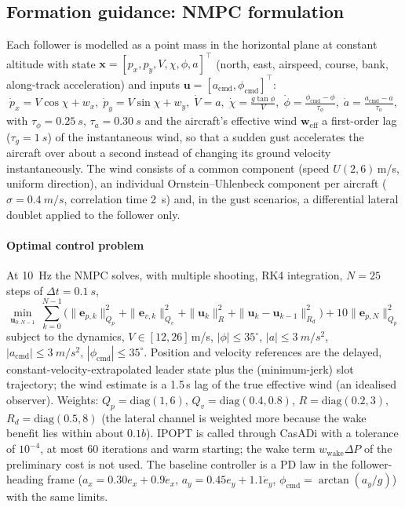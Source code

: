 \subsection{Formation guidance: NMPC formulation}\label{sec:nmpc}
Each follower is modelled as a point mass in the horizontal plane at constant altitude with state $\mathbf x=[p_x,p_y,V,\chi,\phi,a]^\top$ (north, east, airspeed, course, bank, along-track acceleration) and inputs $\mathbf u=[a_{\mathrm{cmd}},\phi_{\mathrm{cmd}}]^\top$:
\begin{equation}
\dot p_x=V\cos\chi+w_x,\;\dot p_y=V\sin\chi+w_y,\;\dot V=a,\;\dot\chi=\tfrac{g\tan\phi}{V},\;\dot\phi=\tfrac{\phi_{\mathrm{cmd}}-\phi}{\tau_\phi},\;\dot a=\tfrac{a_{\mathrm{cmd}}-a}{\tau_a},
\end{equation}
with $\tau_\phi=\SI{0.25}{s}$, $\tau_a=\SI{0.30}{s}$ and the aircraft's effective wind $\mathbf w_{\mathrm{eff}}$ a first-order lag ($\tau_g=\SI{1}{s}$) of the instantaneous wind, so that a sudden gust accelerates the aircraft over about a second instead of changing its ground velocity instantaneously. The wind consists of a common component (speed $U(2,6)$\,m/s, uniform direction), an individual Ornstein--Uhlenbeck component per aircraft ($\sigma=\SI{0.4}{m/s}$, correlation time \SI{2}{s}) and, in the gust scenarios, a differential lateral doublet applied to the follower only.

\paragraph{Optimal control problem} At \SI{10}{Hz} the NMPC solves, with multiple shooting, RK4 integration, $N=25$ steps of $\Delta t=\SI{0.1}{s}$,
\begin{equation}
\min_{\mathbf u_{0:N-1}}\ \sum_{k=0}^{N-1}\Big(\|\mathbf e_{p,k}\|^2_{Q_p}+\|\mathbf e_{v,k}\|^2_{Q_v}+\|\mathbf u_k\|^2_{R}+\|\mathbf u_k-\mathbf u_{k-1}\|^2_{R_d}\Big)+10\|\mathbf e_{p,N}\|^2_{Q_p}
\end{equation}
subject to the dynamics, $V\in[12,26]$\,m/s, $|\phi|\le35^\circ$, $|a|\le\SI{3}{m/s^2}$, $|a_{\mathrm{cmd}}|\le\SI{3}{m/s^2}$, $|\phi_{\mathrm{cmd}}|\le35^\circ$. Position and velocity references are the delayed, constant-velocity-extrapolated leader state plus the (minimum-jerk) slot trajectory; the wind estimate is a 1.5\,s lag of the true effective wind (an idealised observer). Weights: $Q_p=\mathrm{diag}(1,6)$, $Q_v=\mathrm{diag}(0.4,0.8)$, $R=\mathrm{diag}(0.2,3)$, $R_d=\mathrm{diag}(0.5,8)$ (the lateral channel is weighted more because the wake benefit lies within about $0.1b$). IPOPT \cite{wachter2006} is called through CasADi \cite{andersson2019} with a tolerance of $10^{-4}$, at most 60 iterations and warm starting; the wake term $w_{\mathrm{wake}}\Delta P$ of the preliminary cost is not used. The baseline controller is a PD law in the follower-heading frame ($a_x=0.30e_x+0.9\dot e_x$, $a_y=0.45e_y+1.1\dot e_y$, $\phi_{\mathrm{cmd}}=\arctan(a_y/g)$) with the same limits.

